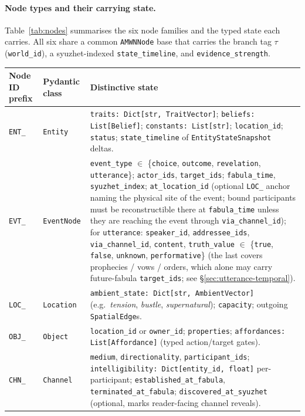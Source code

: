 \documentclass[11pt]{article}
\begin{document}
\paragraph{Node types and their carrying state.}
Table~\ref{tab:nodes} summarises the six node families and the
typed state each carries. All six share a common
\texttt{AMWNNode} base that carries the branch tag $\tau$
(\texttt{world\_id}), a syuzhet-indexed
\texttt{state\_timeline}, and \texttt{evidence\_strength}.

\begin{table}[h]
\centering\small
\begin{tabular}{@{}p{2cm}p{4.0cm}p{8.5cm}@{}}
\toprule
Node ID prefix & Pydantic class & Distinctive state \\
\midrule
\texttt{ENT\_} & \texttt{Entity} & \texttt{traits: Dict[str, TraitVector]}; \texttt{beliefs: List[Belief]}; \texttt{constants: List[str]}; \texttt{location\_id}; \texttt{status}; \texttt{state\_timeline} of \texttt{EntityStateSnapshot} deltas. \\
\texttt{EVT\_} & \texttt{EventNode} & \texttt{event\_type} $\in$ \{\texttt{choice}, \texttt{outcome}, \texttt{revelation}, \texttt{utterance}\}; \texttt{actor\_ids}, \texttt{target\_ids}; \texttt{fabula\_time}, \texttt{syuzhet\_index}; \texttt{at\_location\_id} (optional \texttt{LOC\_} anchor naming the physical site of the event; bound participants must be reconstructible there at \texttt{fabula\_time} unless they are reaching the event through \texttt{via\_channel\_id}); for \texttt{utterance}: \texttt{speaker\_id}, \texttt{addressee\_ids}, \texttt{via\_channel\_id}, \texttt{content}, \texttt{truth\_value} $\in$ \{\texttt{true}, \texttt{false}, \texttt{unknown}, \texttt{performative}\} (the last covers prophecies / vows / orders, which alone may carry future-fabula \texttt{target\_ids}; see \S\ref{sec:utterance-temporal}). \\
\texttt{LOC\_} & \texttt{Location} & \texttt{ambient\_state: Dict[str, AmbientVector]} (e.g.\ \textit{tension}, \textit{bustle}, \textit{supernatural}); \texttt{capacity}; outgoing \texttt{SpatialEdge}s. \\
\texttt{OBJ\_} & \texttt{Object} & \texttt{location\_id} or \texttt{owner\_id}; \texttt{properties}; \texttt{affordances: List[Affordance]} (typed action/target gates). \\
\texttt{CHN\_} & \texttt{Channel} & \texttt{medium}, \texttt{directionality}, \texttt{participant\_ids}; \texttt{intelligibility: Dict[entity\_id, float]} per-participant; \texttt{established\_at\_fabula}, \texttt{terminated\_at\_fabula}; \texttt{discovered\_at\_syuzhet} (optional, marks reader-facing channel reveals). \\

\end{tabular}
\end{table}
\end{document}
